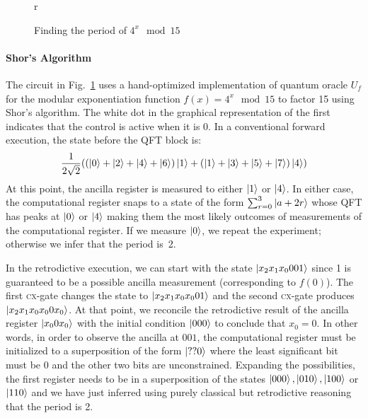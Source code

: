 \documentclass[sigplan]{acmart}
\newcommand{\cx}{\textsc{cx}}
\begin{document}
\begin{figure}{r}
\begin{center}
\end{center}
\caption{\label{fig:shor15}Finding the period of $4^x \mod{15}$}
\end{figure}
\paragraph*{Shor's Algorithm}
The circuit in Fig.~\ref{fig:shor15} uses a hand-optimized
implementation of quantum oracle $U_f$ for the modular exponentiation
function $f(x) = 4^x \mod{15}$ to factor 15 using Shor's
algorithm. The white dot in the graphical representation of the first
indicates that the control is active when it is 0. In a conventional
forward execution, the state before the QFT block is:
\[
\frac{1}{2\sqrt{2}} (
  (\ket{0} + \ket{2} + \ket{4} + \ket{6}) \ket{1} + 
  (\ket{1} + \ket{3} + \ket{5} + \ket{7}) \ket{4}
  )
\]
At this point, the ancilla register is measured to either $\ket{1}$ or
$\ket{4}$. In either case, the computational register snaps to a state
of the form $\sum_{r=0}^3 \ket{a+2r}$ whose QFT has peaks at $\ket{0}$
or $\ket{4}$ making them the most likely outcomes of measurements of
the computational register. If we measure $\ket{0}$, we repeat the
experiment; otherwise we infer that the period is~2.

In the retrodictive execution, we can start with the state
$\ket{x_2x_1x_0001}$ since 1 is guaranteed to be a possible ancilla
measurement (corresponding to $f(0)$). The first \cx-gate changes the
state to $\ket{x_2x_1x_0x_001}$ and the second \cx-gate produces
$\ket{x_2x_1x_0x_00x_0}$. At that point, we reconcile the retrodictive
result of the ancilla register $\ket{x_00x_0}$ with the initial
condition $\ket{000}$ to conclude that $x_0=0$. In other words, in
order to observe the ancilla at $001$, the computational register must
be initialized to a superposition of the form $\ket{??0}$ where the
least significant bit must be 0 and the other two bits are
unconstrained. Expanding the possibilities, the first register needs
to be in a superposition of the states $\ket{000}, \ket{010},
\ket{100}$ or $\ket{110}$ and we have just inferred using purely
classical but retrodictive reasoning that the period is
2.
\end{document}
